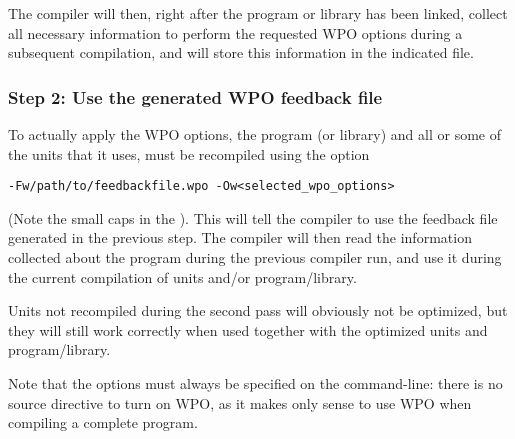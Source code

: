 The compiler will then, right after the program or library has been linked, 
collect all necessary information to perform the requested WPO options during 
a subsequent compilation, and will store this information in the indicated
file.

\subsubsection{Step 2: Use the generated WPO feedback file}
To actually apply the WPO options, the program (or library) and all or some 
of the units that it uses, must be recompiled using the option
\begin{verbatim}
-Fw/path/to/feedbackfile.wpo -Ow<selected_wpo_options>
\end{verbatim}
(Note the small caps in the ). This will tell the compiler to use 
the feedback file generated in the previous step. The compiler will then 
read the information collected about the program during the previous compiler 
run, and use it during the current compilation of units and/or program/library. 

Units not recompiled during the second pass will obviously not be optimized,
but they will still work correctly when used together with the optimized
units and program/library.

\begin{remark}
Note that the options must always be specified on the command-line: there is
no source directive to turn on WPO, as it makes only sense to use WPO when
compiling a complete program.
\end{remark}

